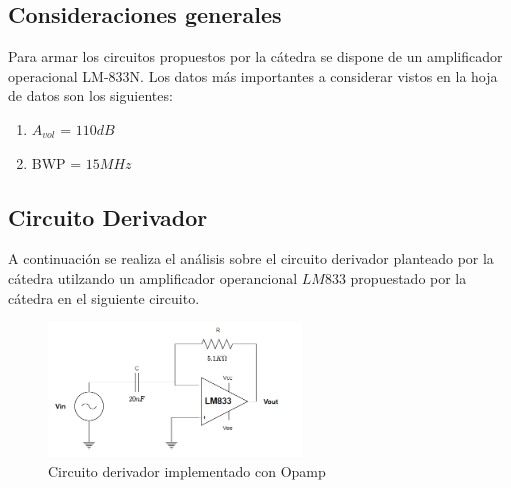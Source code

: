 \subsection{Consideraciones generales}
Para armar los circuitos propuestos por la cátedra se dispone de un
amplificador operacional LM-833N. Los datos más importantes a considerar
vistos en la hoja de datos son los siguientes:
\begin{enumerate}
    \item $A_{vol}$ = $110dB$
    \item BWP = $15 MHz$

\end{enumerate}    

\subsection{Circuito Derivador}
A continuación se realiza el análisis sobre el circuito derivador planteado
por la cátedra utilzando un amplificador operancional $LM833$ propuestado por 
la cátedra en el siguiente circuito.
\begin{figure}[H]
    \centering
    \includegraphics[width=0.6\textwidth]{../Ejercicio3-CircuitoIntegradoresyDerivadores/Imagenes/Derivador/circuito_derivador.png}
    \caption{Circuito derivador implementado con Opamp}
\end{figure}


